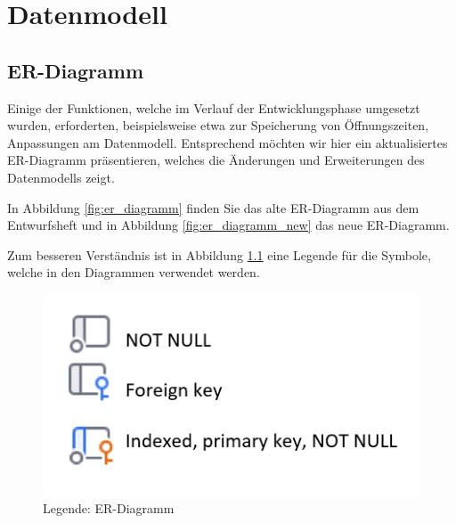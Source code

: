 
\chapter{Datenmodell}
\label{ch:datamodel}

\section{ER-Diagramm}

Einige der Funktionen, welche im Verlauf der Entwicklungsphase umgesetzt wurden,
erforderten, beispielsweise etwa zur Speicherung von Öffnungszeiten, Anpassungen am Datenmodell.
Entsprechend möchten wir hier ein aktualisiertes ER-Diagramm präsentieren, welches die Änderungen und Erweiterungen des Datenmodells zeigt.

In Abbildung \ref{fig:er_diagramm} finden Sie das alte ER-Diagramm aus dem Entwurfsheft und in Abbildung \ref{fig:er_diagramm_new} das neue ER-Diagramm.

Zum besseren Verständnis ist in Abbildung \ref{fig:er_diagramm_legend} eine Legende für die Symbole, welche in den Diagrammen verwendet werden.

\begin{figure}[ht]
    \centering
    \includegraphics[scale=0.5]{figures/ERLegend}
    \caption{Legende: ER-Diagramm}
    \label{fig:er_diagramm_legend}
\end{figure}

